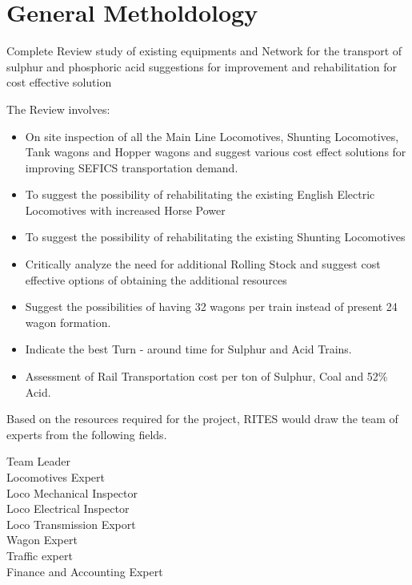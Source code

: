 \section{General Metholdology}

Complete Review
study of existing equipments and Network for the transport of sulphur and phosphoric acid
suggestions for improvement and rehabilitation for cost effective solution


\vskip 1cm

The Review involves:

\begin{itemize}
\item On site inspection of all the Main Line Locomotives, Shunting Locomotives, Tank wagons and Hopper wagons and suggest various cost
effect solutions for improving SEFICS transportation demand.

\item To suggest the possibility of rehabilitating the existing English Electric Locomotives with increased Horse Power
\item To suggest the possibility of rehabilitating the existing Shunting Locomotives 
\item Critically analyze the need for additional Rolling Stock and suggest cost effective options of obtaining the additional
resources
\item Suggest the possibilities of having 32 wagons per train instead of present 24 wagon formation.
\item Indicate the best Turn - around time for Sulphur and Acid Trains.
\item Assessment of Rail Transportation cost per ton of Sulphur, Coal and 52\% Acid.
\end{itemize}

Based on the resources required for the project, RITES would draw the team of experts from the following fields.

Team Leader\\
Locomotives Expert\\
Loco Mechanical Inspector\\
Loco Electrical Inspector\\
Loco Transmission Export \\

Wagon Expert\\
Traffic expert\\
Finance and Accounting Expert\\